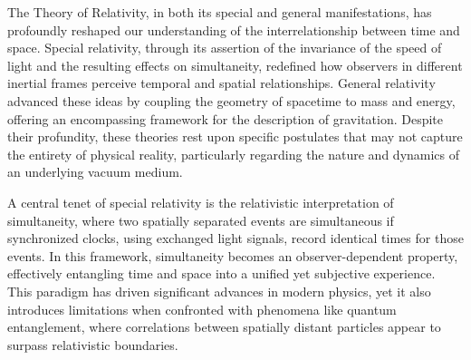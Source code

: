 \documentclass[10pt,reprint,aps,onecolumn,nofootinbib]{revtex4-2}
\begin{document}
            The Theory of Relativity, in both its special and general manifestations, has profoundly reshaped our understanding of the interrelationship between time and space.\cite{Einstein1905,Einstein1916} Special relativity, through its assertion of the invariance of the speed of light and the resulting effects on simultaneity, redefined how observers in different inertial frames perceive temporal and spatial relationships. General relativity advanced these ideas by coupling the geometry of spacetime to mass and energy, offering an encompassing framework for the description of gravitation. Despite their profundity, these theories rest upon specific postulates that may not capture the entirety of physical reality, particularly regarding the nature and dynamics of an underlying vacuum medium.

            A central tenet of special relativity is the relativistic interpretation of simultaneity, where two spatially separated events are simultaneous if synchronized clocks, using exchanged light signals, record identical times for those events.\cite{Einstein1905} In this framework, simultaneity becomes an observer-dependent property, effectively entangling time and space into a unified yet subjective experience. This paradigm has driven significant advances in modern physics, yet it also introduces limitations when confronted with phenomena like quantum entanglement, where correlations between spatially distant particles appear to surpass relativistic boundaries.\cite{EinsteinPodolskyRosen1935,Aspect1982}
\end{document}
